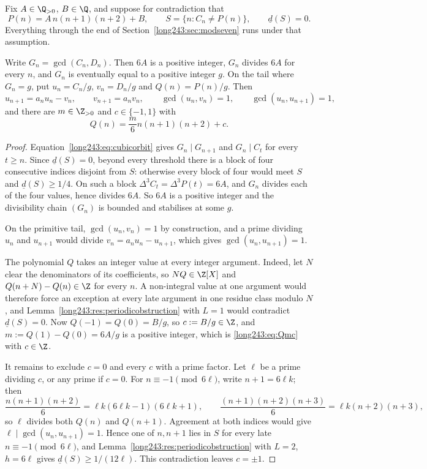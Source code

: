 Fix $A\in\Q_{>0}$, $B\in\Q$, and suppose for contradiction that
\[
 P(n)=A\,n(n+1)(n+2)+B,
 \qquad S=\{n:C_n\ne P(n)\},
 \qquad \underline d(S)=0 .
\]
Everything through the end of Section~\ref{long243:sec:modseven} runs under that
assumption.

\begin{lemma}\label{long243:res:gcdshape}
Write $G_n=\gcd(C_n,D_n)$.  Then $6A$ is a positive integer, $G_n$ divides
$6A$ for every $n$, and $G_n$ is eventually equal to a positive integer
$g$.  On the tail where $G_n=g$, put $u_n=C_n/g$, $v_n=D_n/g$ and
$Q(n)=P(n)/g$.  Then
\begin{equation}\label{long243:eq:primitivetail}
 u_{n+1}=a_nu_n-v_n,\qquad v_{n+1}=a_nv_n,\qquad \gcd(u_n,v_n)=1,
 \qquad\gcd(u_n,u_{n+1})=1,
\end{equation}
and there are $m\in\Z_{>0}$ and $c\in\{-1,1\}$ with
\begin{equation}\label{long243:eq:Qmc}
 Q(n)=\frac m6n(n+1)(n+2)+c .
\end{equation}
\end{lemma}

\begin{proof}
Equation~\eqref{long243:eq:cubicorbit} gives $G_n\mid G_{n+1}$ and $G_n\mid C_t$ for
every $t\ge n$.  Since $\underline d(S)=0$, beyond every threshold there is a block of four
consecutive indices disjoint from $S$: otherwise every block of four would meet
$S$ and $\underline d(S)\ge1/4$.  On such a block $\Delta^3C_t=\Delta^3P(t)=6A$, and
$G_n$ divides each of the four values, hence divides $6A$.  So $6A$
is a positive integer and the divisibility chain $(G_n)$ is bounded and
stabilises at some $g$.

On the primitive tail, $\gcd(u_n,v_n)=1$ by construction, and a prime dividing
$u_n$ and $u_{n+1}$ would divide $v_n=a_nu_n-u_{n+1}$, which gives
$\gcd(u_n,u_{n+1})=1$.

The polynomial $Q$ takes an integer value at every integer argument.  Indeed,
let $N$ clear the denominators of its coefficients, so $NQ\in\Z[X]$ and
$Q(n+N)-Q(n)\in\Z$ for every $n$.  A non-integral value at one argument would
therefore force an exception at every late argument in one residue class modulo
$N$, and Lemma~\ref{long243:res:periodicobstruction} with $L=1$ would contradict
$\underline d(S)=0$.  Now $Q(-1)=Q(0)=B/g$, so $c:=B/g\in\Z$, and
$m:=Q(1)-Q(0)=6A/g$ is a positive integer, which is \eqref{long243:eq:Qmc} with
$c\in\Z$.

It remains to exclude $c=0$ and every $c$ with a prime factor.  Let $\ell$ be a
prime dividing $c$, or any prime if $c=0$.  For $n\equiv-1\pmod{6\ell}$, write
$n+1=6\ell k$; then
\[
 \frac{n(n+1)(n+2)}6=\ell k(6\ell k-1)(6\ell k+1),
 \qquad
 \frac{(n+1)(n+2)(n+3)}6=\ell k(n+2)(n+3),
\]
so $\ell$ divides both $Q(n)$ and $Q(n+1)$.  Agreement at both indices would
give $\ell\mid\gcd(u_n,u_{n+1})=1$.  Hence one of $n,n+1$ lies in $S$ for every
late $n\equiv-1\pmod{6\ell}$, and Lemma~\ref{long243:res:periodicobstruction} with
$L=2$, $h=6\ell$ gives $\underline d(S)\ge1/(12\ell)$.  This contradiction
leaves $c=\pm1$.
\end{proof}

